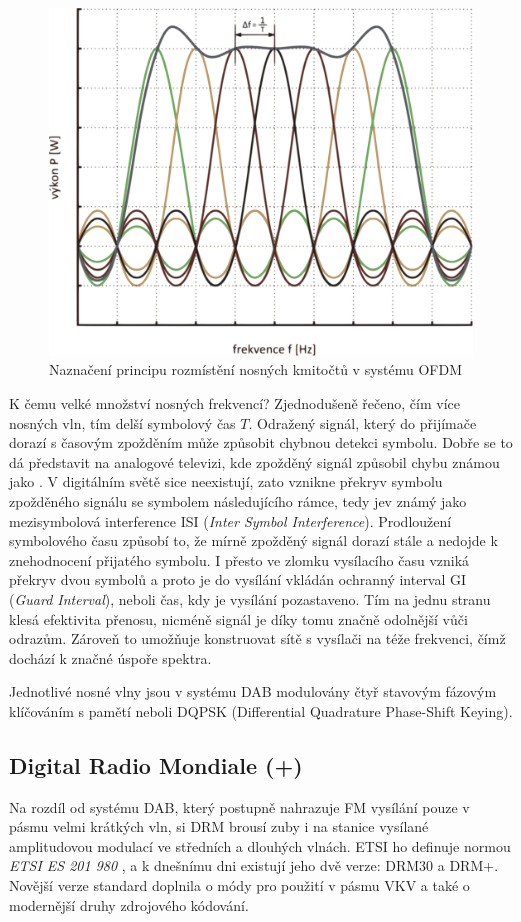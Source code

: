 \begin{figure}[h]
    \centering
    \includegraphics[width = .5\textwidth]{pic/ofdm2.pdf}
    \caption{Naznačení principu rozmístění nosných kmitočtů v systému OFDM \cite{web:ofdm}}
    \label{pic:ofdm}
\end{figure}


K čemu velké množství nosných frekvencí? Zjednodušeně řečeno, čím více nosných vln, tím delší symbolový čas $T$. Odražený signál, který do přijímače dorazí s časovým zpožděním může způsobit chybnou detekci symbolu. Dobře se to dá představit na analogové televizi, kde zpožděný signál způsobil chybu známou jako . V digitálním světě sice  neexistují, zato vznikne překryv symbolu zpožděného signálu se symbolem následujícího rámce, tedy jev známý jako mezisymbolová interference ISI (\textit{Inter Symbol Interference}). Prodloužení symbolového času způsobí to, že mírně zpožděný signál dorazí stále  a nedojde k znehodnocení přijatého symbolu. I přesto ve zlomku vysílacího času vzniká překryv dvou symbolů a proto je do vysílání vkládán ochranný interval GI (\textit{Guard Interval}), neboli čas, kdy je vysílání pozastaveno. Tím na jednu stranu klesá efektivita přenosu, nicméně signál je díky tomu značně odolnější vůči odrazům. Zároveň to umožňuje konstruovat sítě s vysílači na téže frekvenci, čímž dochází k značné úspoře spektra.    

Jednotlivé nosné vlny jsou v systému DAB modulovány čtyř stavovým fázovým klíčováním s pamětí neboli DQPSK (Differential Quadrature Phase-Shift Keying).

\subsection{Digital Radio Mondiale (+)}


Na rozdíl od systému DAB, který postupně nahrazuje FM vysílání pouze v pásmu velmi krátkých vln, si DRM brousí zuby i na stanice vysílané amplitudovou modulací ve středních a dlouhých vlnách. ETSI ho definuje normou \textit{ETSI ES 201 980} \cite{etsi:drm}, a k dnešnímu dni existují jeho dvě verze: DRM30 a DRM+. Novější verze standard doplnila o módy pro použití v pásmu VKV a také o modernější druhy zdrojového kódování.

